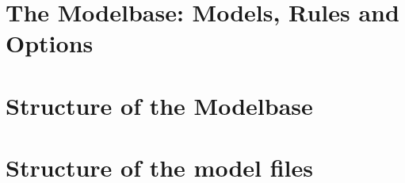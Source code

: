 \documentclass[11pt,a4paper]{article}
\begin{document}
\section{The Modelbase: Models, Rules and Options}\label{sec:usingMMB}
\vspace{0.5cm}


\section{Structure of the Modelbase}
\label{sec:MMBstructure}
\vspace{0.5cm}


\section{Structure of the model files}\label{sec:ModelfileStructure}
\vspace{0.5cm}


\vspace{0.5cm}
%


\vspace{0.5cm}
%





\end{document}
